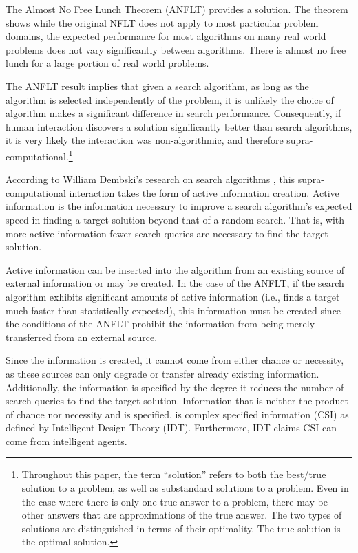 The Almost No Free Lunch Theorem (ANFLT)  provides a solution.   The theorem shows while the original NFLT does not apply to most particular problem domains, the expected performance for most algorithms on many real world problems does not vary significantly between algorithms.  There is almost no free lunch for a large portion of real world problems. 

The ANFLT result implies that given a search algorithm, as long as the algorithm is selected independently of the problem, it is unlikely the choice of algorithm  makes a significant difference in search performance.  Consequently, if  human interaction discovers a solution significantly better than search algorithms, it is very likely the interaction was non-algorithmic, and therefore supra-computational.\footnote{Throughout this paper, the term ``solution'' refers to both the best/true solution to a problem, as well as substandard solutions to a problem.  Even in the case where there is only one true answer to a problem, there may be other answers that are approximations of the true answer.  The two types of solutions are distinguished in terms of their optimality.  The true solution is the optimal solution.}

According to William Dembski's research on search algorithms \citep{dembski10:_searc_for_searc}, this supra-computational interaction takes the form of active information creation.  Active information is the information necessary to improve a search algorithm's expected speed in finding a target solution beyond that of a random search.  That is, with more active information fewer search queries are necessary to find the target solution.   

Active information can be inserted into the algorithm from an existing source of external information or may be created.  In the case of the ANFLT, if the search algorithm exhibits significant amounts of active information (i.e., finds a target much faster than statistically expected), this information must be created since the conditions of the ANFLT prohibit the information from being merely transferred from an external source.  

Since the information is created, it cannot come from either chance or necessity, as these sources can only degrade or transfer already existing information.  Additionally, the information is specified by the degree it reduces the number of search queries to find the target solution.  Information that is neither the product of chance nor necessity and is specified, is complex specified information (CSI) \citep{dembski:_specif} as defined by Intelligent Design Theory (IDT).  Furthermore, IDT claims CSI can come from intelligent agents.

